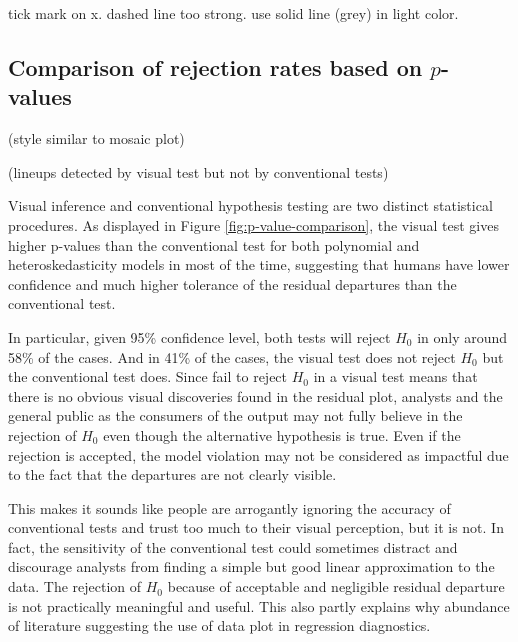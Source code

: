 \documentclass[]{interact}
\theoremstyle{plain}%
\theoremstyle{definition}
\theoremstyle{remark}
\begin{document}
tick mark on x. dashed line too strong. use solid line (grey) in light
color.

\hypertarget{comparison-of-rejection-rates-based-on-p-values}{%
\subsection{\texorpdfstring{Comparison of rejection rates based on
\(p\)-values}{Comparison of rejection rates based on p-values}}\label{comparison-of-rejection-rates-based-on-p-values}}

(style similar to mosaic plot)

(lineups detected by visual test but not by conventional tests)

Visual inference and conventional hypothesis testing are two distinct
statistical procedures. As displayed in Figure
\ref{fig:p-value-comparison}, the visual test gives higher p-values than
the conventional test for both polynomial and heteroskedasticity models
in most of the time, suggesting that humans have lower confidence and
much higher tolerance of the residual departures than the conventional
test.

In particular, given 95\% confidence level, both tests will reject
\(H_0\) in only around 58\% of the cases. And in 41\% of the cases, the
visual test does not reject \(H_0\) but the conventional test does.
Since fail to reject \(H_0\) in a visual test means that there is no
obvious visual discoveries found in the residual plot, analysts and the
general public as the consumers of the output may not fully believe in
the rejection of \(H_0\) even though the alternative hypothesis is true.
Even if the rejection is accepted, the model violation may not be
considered as impactful due to the fact that the departures are not
clearly visible.

This makes it sounds like people are arrogantly ignoring the accuracy of
conventional tests and trust too much to their visual perception, but it
is not. In fact, the sensitivity of the conventional test could
sometimes distract and discourage analysts from finding a simple but
good linear approximation to the data. The rejection of \(H_0\) because
of acceptable and negligible residual departure is not practically
meaningful and useful. This also partly explains why abundance of
literature suggesting the use of data plot in regression diagnostics.
\end{document}
